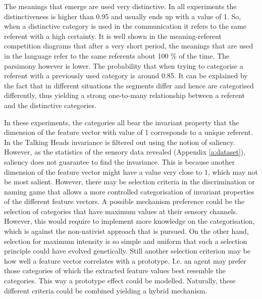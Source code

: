 The meanings that emerge are used very distinctive. In all experiments the distinctiveness is higher than 0.95 and usually ends up with a value of 1. So, when a distinctive category is used in the communication it refers to the same referent with a high certainty. It is well shown in the meaning-referent competition diagrams that after a very short period, the meanings that are used in the language refer to the same referents about 100 \% of the time. The parsimony however is lower. The probability that when trying to categorise a referent with a previously used category is around 0.85. It can be explained by the fact that in different situations the segments differ and hence are categorised differently, thus yielding a strong one-to-many relationship between a referent and the distinctive categories.

In these experiments, the categories all bear the invariant property that the dimension of the feature vector with value of 1 corresponds to a unique referent. In the Talking Heads invariance is filtered out using the notion of saliency. However, as the statistics of the sensory data revealed (Appendix \ref{a:dataset}), saliency does not guarantee to find the invariance. This is because another dimension of the feature vector might have a value very close to 1, which may not be most salient. However, there may be selection criteria in the discrimination or naming game that allows a more controlled categorisation of invariant properties of the different feature vectors. A possible mechanism preference could be the selection of categories that have maximum values at their sensory channels. However, this would require to implement more knowledge on the categorisation, which is against the non-nativist approach that is pursued. On the other hand, selection for maximum intensity is so simple and uniform that such a selection principle could have evolved genetically. Still another selection criterion may be how well a feature vector correlates with a prototype. I.e. an agent may prefer those categories of which the extracted feature values best resemble the categories. This way a prototype effect \citep{rosch:1976} could be modelled. Naturally, these different criteria could be combined yielding a hybrid mechanism.  


